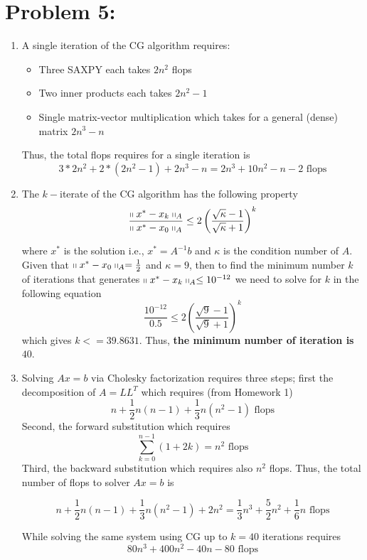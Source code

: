 \section*{Problem 5:}
\begin{enumerate}
\item A single iteration of the CG algorithm requires:
\begin{itemize}
\item Three SAXPY each takes $2n^{2}$ flops
\item Two inner products each takes $2n^{2} -1$
\item Single matrix-vector multiplication which takes for a general (dense) matrix $2n^3-n$
\end{itemize}
Thus, the total flops requires for a single iteration is 
$$
3*2n^{2} + 2*(2n^{2} -1) + 2n^3-n = 2n^{3} + 10 n^{2} - n - 2 \text{\ flops}
$$

\item The $k-$iterate of the CG algorithm has the following property
$$
\frac{\shortparallel x^{*} - x_{k} \shortparallel_{A}}{\shortparallel x^{*} - x_{0} \shortparallel_{A}} \leq 2 \left( \frac{\sqrt{\kappa}-1}{\sqrt{\kappa}+1}\right) ^{k}
$$

where $x^{*}$ is the solution i.e.,  $x^{*} = A^{-1}b$ and $\kappa$ is the condition number of $A$. Given that $\shortparallel x^{*} - x_{0} \shortparallel_{A} = \frac{1}{2}$ and $\kappa = 9$, then to find the minimum number $k$ of iterations that generates $\shortparallel x^{*} - x_{k} \shortparallel_{A} \leq 10^{-12}$ we need to solve for $k$ in the following equation 
$$
\frac{10^{-12}}{0.5} \leq 2 \left( \frac{\sqrt{9}-1}{\sqrt{9}+1}\right) ^{k}
$$
which gives $k<= 39.8631$. Thus, \textbf{the minimum number of iteration is $40$}.

\item Solving $Ax = b$ via Cholesky factorization requires three steps; first the decomposition of $A = LL^{T}$ which requires (from Homework 1)
$$
n + \frac{1}{2}n(n-1) + \frac{1}{3}n(n^2-1) \text{\ flops}
$$
Second, the forward substitution which requires 
$$
\sum_{k=0}^{n-1}(1+2k) = n^{2} \text{\ flops}
$$
Third, the backward substitution which requires also $n^{2}$ flops. Thus, the total number of flops to solver $Ax = b$ is 

$$
n + \frac{1}{2}n(n-1) + \frac{1}{3}n(n^2-1) + 2n^{2} = \frac{1}{3}n^{3} + \frac{5}{2}n^{2} + \frac{1}{6}n \text{\ flops}
$$

While solving the same system using CG up to $k=40$ iterations requires 
$$
80n^{3} + 400 n^{2} - 40n - 80 \text{\ flops}
$$
\end{enumerate} 